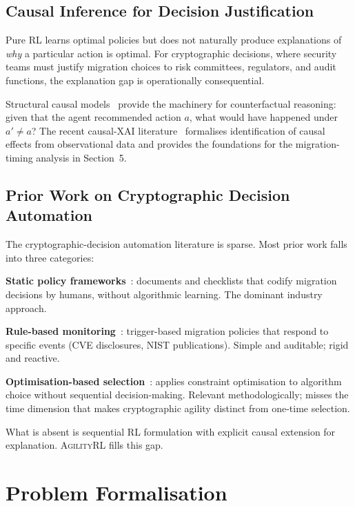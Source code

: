 \documentclass[sigconf,nonacm]{acmart}
\begin{document}
\subsection{Causal Inference for Decision Justification}

Pure RL learns optimal policies but does not naturally produce
explanations of \emph{why} a particular action is optimal. For
cryptographic decisions, where security teams must justify migration
choices to risk committees, regulators, and audit functions, the
explanation gap is operationally consequential.

Structural causal models~\cite{pearl2009causality} provide the
machinery for counterfactual reasoning: given that the agent
recommended action $a$, what would have happened under
$a' \neq a$? The recent causal-XAI literature~\cite{beckers2024causal,
janzing2024causal} formalises identification of causal effects from
observational data and provides the foundations for the migration-timing
analysis in Section~5.

\subsection{Prior Work on Cryptographic Decision Automation}

The cryptographic-decision automation literature is sparse. Most prior
work falls into three categories:

\textbf{Static policy frameworks}~\cite{ott2024crypto}: documents and
checklists that codify migration decisions by humans, without
algorithmic learning. The dominant industry approach.

\textbf{Rule-based monitoring}~\cite{paulsen2024rulemig}: trigger-based
migration policies that respond to specific events (CVE disclosures,
NIST publications). Simple and auditable; rigid and reactive.

\textbf{Optimisation-based selection}~\cite{wang2024cryptosel}: applies
constraint optimisation to algorithm choice without sequential
decision-making. Relevant methodologically; misses the time dimension
that makes cryptographic agility distinct from one-time selection.

What is absent is sequential RL formulation with explicit causal
extension for explanation. \textsc{AgilityRL} fills this gap.

\section{Problem Formalisation}
\end{document}
